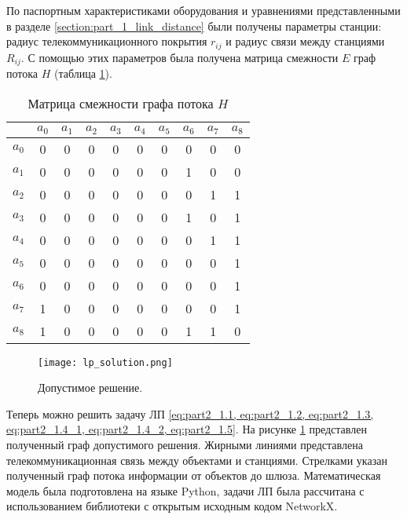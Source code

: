 По паспортным характеристиками оборудования и уравнениями представленными в разделе \cref{section:part_1_link_distance} были получены параметры станции: радиус телекоммуникационного покрытия $r_{ij}$ и радиус связи между станциями $R_{ij}$. С помощью этих параметров была получена матрица смежности $E$ граф потока $H$ (таблица \cref{tab:part3_lp_adj_mat}).




\begin{table}[h!]\centering
\begin{tabular}{|c|| c| c c c c c| c c c|}\hline
    
    & $a_0$& $a_1$& $a_2$& $a_3$& $a_4$& $a_5$& $a_6$& $a_7$ & $a_8$\\
    \hline
    \hline
    $a_0$ & 0&	0&	0&	0&	0&	0&	0 &	0&	0\\
    \hline
    $a_1$ & 0&	0&	0&	0&	0&	0&	1 &	0&	0\\
    $a_2$ & 0&	0&	0&	0&	0&	0&	0 &	1&	1\\
    $a_3$ & 0&	0&	0&	0&	0&	0&	1 &	0&	1\\
    $a_4$ & 0&	0&	0&	0&	0&	0&	0 &	1&	1\\
    $a_5$ & 0&	0&	0&	0&	0&	0&	0 &	0&	1\\
    \hline
    $a_6$ & 0&	0&	0&	0&	0&	0&	0 &	0&	1\\
    $a_7$ & 1&	0&	0&	0&	0&	0&	0 &	0&	1\\
    $a_8$ & 1&	0&	0&	0&	0&	0&	1 &	1&	0\\
    \hline
\end{tabular}\caption{Матрица смежности графа потока $H$}\label{tab:part3_lp_adj_mat}
\end{table}



\begin{figure}[h!]
    \centering
        \texttt{[image: lp\_solution.png]}
    \caption{Допустимое решение.}
    \label{fig:part3_lp_solution}
\end{figure}

Теперь можно решить задачу ЛП \cref{eq:part2_1.1, eq:part2_1.2, eq:part2_1.3, eq:part2_1.4_1, eq:part2_1.4_2, eq:part2_1.5}. На рисунке \cref{fig:part3_lp_solution} представлен полученный граф допустимого решения. Жирными линиями представлена телекоммуникационная связь между объектами и станциями. Стрелками указан полученный граф потока информации от объектов до шлюза. Математическая модель была подготовлена на языке Python, задачи ЛП была рассчитана с использованием библиотеки с открытым исходным кодом NetworkX. 

